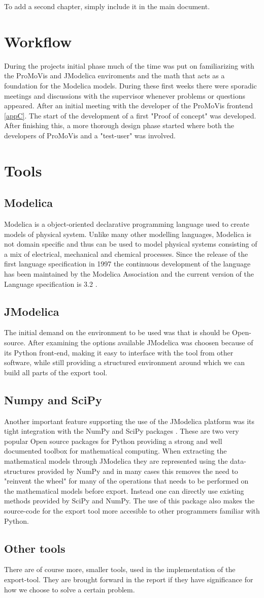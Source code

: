 To add a second chapter, simply include it in the main document.

\section{Workflow}
During the projects initial phase much of the time was put on familiarizing with the ProMoVis and JModelica enviroments and the math that acts as a foundation for the Modelica models. During these first weeks there were sporadic meetings and discussions with the supervisor whenever problems or questions appeared. After an initial meeting with the developer of the ProMoVis frontend \ref{appC}. The start of the development of a first "Proof of concept" was developed. After finishing this, a more thorough design phase started where both the developers of ProMoVis and a "test-user" was involved. 
\section{Tools}
\subsection{Modelica}
Modelica is a object-oriented declarative programming language used to create models of physical system. Unlike many other modelling languages, Modelica is not domain specific and thus can be used to model physical systems consisting of a mix of electrical, mechanical and chemical processes. Since the release of the first language specification in 1997 the continuous development of the language has been maintained by the Modelica Association and the current version of the Language specification is 3.2 \cite{ModelicaSpec}.\nocite{*}
\subsection{JModelica}
The initial demand on the environment to be used was that is should be Open-source. After examining the options available JModelica\cite{jmodelicaorg}\nocite{*} was choosen because of its Python front-end, making it easy to interface with the tool from other software, while still providing a structured environment around which we can build all parts of the export tool.   
\subsection{Numpy and SciPy}
Another important feature supporting the use of the JModelica platform was its tight integration with the NumPy and SciPy packages \cite{scipyorg}\nocite{*}. These are two very popular Open source packages for Python providing a strong and well documented toolbox for mathematical computing. When extracting the mathematical models through JModelica they are represented using the data-structures provided by NumPy and in many cases this removes the need to "reinvent the wheel" for many of the operations that needs to be performed on the mathematical models before export. Instead one can directly use existing methods provided by SciPy and NumPy. The use of this package also makes the source-code for the export tool more accesible to other programmers familiar with Python.
\subsection{Other tools}
There are of course more, smaller tools, used in the implementation of the export-tool. They are brought forward in the report if they have significance for how we choose to solve a certain problem.